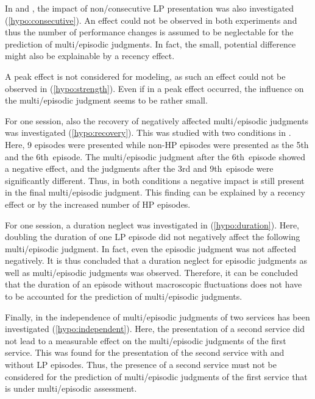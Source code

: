 In \EIIa{} and , the impact of non\-/consecutive \ac{LP} presentation was also investigated (\autoref{hypo:consecutive}).
An effect could not be observed in both experiments and thus the number of performance changes is assumed to be neglectable for the prediction of multi\-/episodic judgments.
In fact, the small, potential difference might also be explainable by a recency effect.

A peak effect is not considered for modeling, as such an effect could not be observed in  (\autoref{hypo:strength}).
Even if in  a peak effect occurred, the influence on the multi\-/episodic judgment seems to be rather small.

For one session, also the recovery of negatively affected multi\-/episodic judgments was investigated (\autoref{hypo:recovery}).
This was studied with two conditions in .
Here, 9 episodes were presented while non-\ac{HP} episodes were presented as the 5th and the 6th~episode.
The multi\-/episodic judgment after the 6th~episode showed a negative effect, and the judgments after the 3rd and 9th~episode were significantly different.
Thus, in both conditions a negative impact is still present in the final multi\-/episodic judgment.
This finding can be explained by a recency effect or by the increased number of \ac{HP} episodes.

For one session, a duration neglect was investigated in  (\autoref{hypo:duration}). 
Here, doubling the duration of one \ac{LP} episode did not negatively affect the following multi\-/episodic judgment.
In fact, even the episodic judgment was not affected negatively.
It is thus concluded that a duration neglect for episodic judgments as well as multi\-/episodic judgments was observed.
Therefore, it can be concluded that the duration of an episode without macroscopic fluctuations does not have to be accounted for the prediction of multi\-/episodic judgments.

Finally, in \EIIb{} the independence of multi\-/episodic judgments of two services has been investigated (\autoref{hypo:independent}).
Here, the presentation of a second service did not lead to a measurable effect on the multi\-/episodic judgments of the first service.
This was found for the presentation of the second service with and without \ac{LP} episodes.
Thus, the presence of a second service must not be considered for the prediction of multi\-/episodic judgments of the first service that is under multi\-/episodic assessment.

